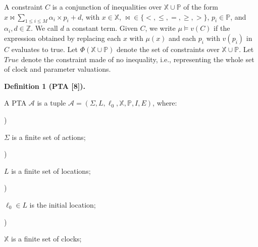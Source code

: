  
 
A constraint $C$ is a conjunction of inequalities over $\mathbb{X}\cup\mathbb{P}$ of the form $x\bowtie\sum_{1\leq i\leq M}\alpha_{i}\times p_{i}+d$, with $x\in\mathbb{X}$, ${\bowtie}\in\{<,\leq,=,\geq,>\}$, $p_{i}\in\mathbb{P}$, and $\alpha_{i},d\in\mathbb{Z}$. We call $d$ a constant term. Given $C$, we write $\mu\models v(C)$ if the expression obtained by replacing each $x$ with $\mu(x)$ and each $p_{i}$ with $v(p_{i})$ in $C$ evaluates to true. Let $\Phi(\mathbb{X}\cup\mathbb{P})$ denote the set of constraints over $\mathbb{X}\cup\mathbb{P}$. Let $\mathit{True}$ denote the constraint made of no inequality, i.e., representing the whole set of clock and parameter valuations.\par
 
 
 
\par\medskip\noindent\textbf{Definition 1 (PTA [8]).}\par
 
 
A PTA $\mathcal{A}$ is a tuple $\mathcal{A}=(\Sigma,L,\mathrm{\mathrm{\ell}_{0}},\mathbb{X},\mathbb{P},I,E)$, where:\par
  
\par{}) 
 
$\Sigma$ is a finite set of actions;\par
 
 
 
\par{}) 
 
$L$ is a finite set of locations;\par
 
 
 
\par{}) 
 
$\mathrm{\mathrm{\ell}_{0}}\in L$ is the initial location;\par
 
 
 
\par{}) 
 
$\mathbb{X}$ is a finite set of clocks;\par
 
